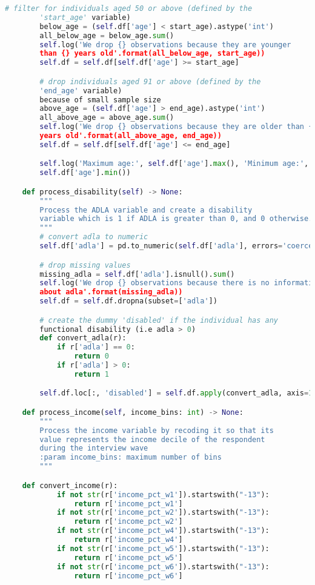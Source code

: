 \begin{lstlisting}[language=Python]
        # filter for individuals aged 50 or above (defined by the
        'start_age' variable)
        below_age = (self.df['age'] < start_age).astype('int')
        all_below_age = below_age.sum()
        self.log('We drop {} observations because they are younger
        than {} years old'.format(all_below_age, start_age))
        self.df = self.df[self.df['age'] >= start_age]

        # drop individuals aged 91 or above (defined by the 
        'end_age' variable)
        because of small sample size
        above_age = (self.df['age'] > end_age).astype('int')
        all_above_age = above_age.sum()
        self.log('We drop {} observations because they are older than {}
        years old'.format(all_above_age, end_age))
        self.df = self.df[self.df['age'] <= end_age]

        self.log('Maximum age:', self.df['age'].max(), 'Minimum age:',
        self.df['age'].min())

    def process_disability(self) -> None:
        """
        Process the ADLA variable and create a disability
        variable which is 1 if ADLA is greater than 0, and 0 otherwise.
        """
        # convert adla to numeric
        self.df['adla'] = pd.to_numeric(self.df['adla'], errors='coerce')

        # drop missing values
        missing_adla = self.df['adla'].isnull().sum()
        self.log('We drop {} observations because there is no information
        about adla'.format(missing_adla))
        self.df = self.df.dropna(subset=['adla'])

        # create the dummy 'disabled' if the individual has any
        functional disability (i.e adla > 0)
        def convert_adla(r):
            if r['adla'] == 0:
                return 0
            if r['adla'] > 0:
                return 1

        self.df.loc[:, 'disabled'] = self.df.apply(convert_adla, axis=1)

    def process_income(self, income_bins: int) -> None:
        """
        Process the income variable by recoding it so that its
        value represents the income decile of the respondent
        during the interview wave
        :param income_bins: maximum number of bins
        """

    def convert_income(r):
            if not str(r['income_pct_w1']).startswith("-13"):
                return r['income_pct_w1']
            if not str(r['income_pct_w2']).startswith("-13"):
                return r['income_pct_w2']
            if not str(r['income_pct_w4']).startswith("-13"):
                return r['income_pct_w4']
            if not str(r['income_pct_w5']).startswith("-13"):
                return r['income_pct_w5']
            if not str(r['income_pct_w6']).startswith("-13"):
                return r['income_pct_w6']


\end{lstlisting}
